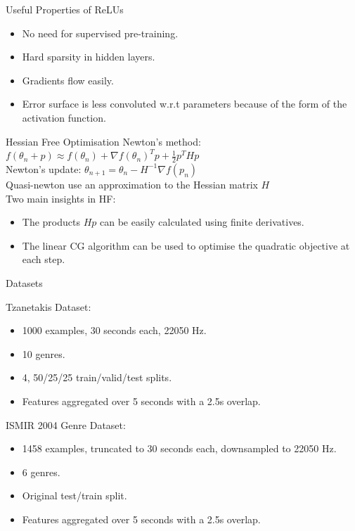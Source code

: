 \documentclass{beamer}
\begin{document}
\begin{frame}{Useful Properties of ReLUs}
\begin{itemize}
    \item No need for supervised pre-training.
    \item Hard sparsity in hidden layers.
    \item Gradients flow easily.
    \item Error surface is less convoluted w.r.t parameters because of the form of the activation function.
  \end{itemize}
\end{frame}

\begin{frame}{Hessian Free Optimisation}
Newton's method: $ f(\theta_{n} + p) \approx f(\theta_{n}) + \nabla f(\theta_{n})^{T}p + \frac{1}{2}p^{T}Hp$\\
Newton's update: $\theta_{n+1} = \theta_{n} - H^{-1}\nabla f(p_{n})$\\
Quasi-newton use an approximation to the Hessian matrix $H$\\
Two main insights in HF:
\begin{itemize}
    \item The products $Hp$ can be easily calculated using finite derivatives. 
    \item The linear CG algorithm can be used to optimise the quadratic objective at each step. 
  \end{itemize}
\end{frame}

\begin{frame}{Datasets}

Tzanetakis Dataset:
\begin{itemize}
    \item 1000 examples, 30 seconds each, 22050 Hz.
    \item 10 genres. 
    \item 4, 50/25/25 train/valid/test splits. 
    \item Features aggregated over 5 seconds with a 2.5s overlap. 
  \end{itemize}
ISMIR 2004 Genre Dataset:
\begin{itemize}
    \item 1458 examples, truncated to 30 seconds each, downsampled to 22050 Hz.
    \item 6 genres. 
    \item Original test/train split. 
    \item Features aggregated over 5 seconds with a 2.5s overlap. 
  \end{itemize}
\end{frame}
\end{document}
